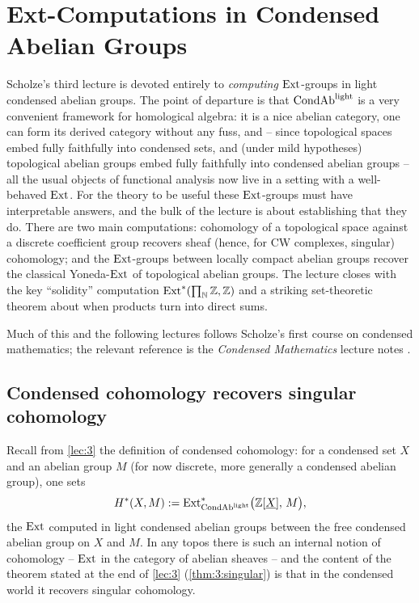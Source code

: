 \section{Ext-Computations in Condensed Abelian Groups}
\label{lec:4}

Scholze's third lecture is devoted entirely to \emph{computing} $\operatorname{Ext}$-groups in
light condensed abelian groups. The point of departure is that $\mathrm{CondAb}^{\mathrm{light}}$ is a
very convenient framework for homological algebra: it is a nice abelian
category, one can form its derived category without any fuss, and -- since
topological spaces embed fully faithfully into condensed sets, and (under mild
hypotheses) topological abelian groups embed fully faithfully into condensed
abelian groups -- all the usual objects of functional analysis now live in a
setting with a well-behaved $\operatorname{Ext}$. For the theory to be useful these
$\operatorname{Ext}$-groups must have interpretable answers, and the bulk of the lecture is
about establishing that they do. There are two main computations: cohomology of
a topological space against a discrete coefficient group recovers sheaf (hence,
for CW complexes, singular) cohomology; and the $\operatorname{Ext}$-groups between locally
compact abelian groups recover the classical Yoneda-$\operatorname{Ext}$ of topological
abelian groups. The lecture closes with the key ``solidity'' computation
$\operatorname{Ext}^\ast(\prod_{\mathbb{N}}\mathbb{Z},\mathbb{Z})$ and a striking
set-theoretic theorem about when products turn into direct sums.

Much of this and the following lectures follows Scholze's first course on
condensed mathematics; the relevant reference is the \emph{Condensed
Mathematics} lecture notes \cite{scholze2019condensed}.

\subsection{Condensed cohomology recovers singular cohomology}

Recall from \cref{lec:3} the definition of condensed cohomology: for a condensed
set $X$ and an abelian group $M$ (for now discrete, more generally a condensed
abelian group), one sets
\[
H^\ast(X,M):=\operatorname{Ext}^\ast_{\mathrm{CondAb}^{\mathrm{light}}}\bigl(\mathbb{Z}[\underline{X}],\,M\bigr),
\]
the $\operatorname{Ext}$ computed in light condensed abelian groups between the free condensed
abelian group on $X$ and $M$. In any topos there is such an internal notion of
cohomology -- $\operatorname{Ext}$ in the category of abelian sheaves -- and the content of
the theorem stated at the end of \cref{lec:3} (\cref{thm:3:singular}) is that in
the condensed world it recovers singular cohomology.

